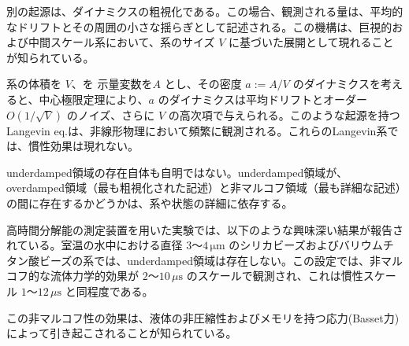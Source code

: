 \documentclass[a4paper,11pt]{jsarticle}
\numberwithin{equation}{section}
\begin{document}
別の起源は、ダイナミクスの粗視化である。この場合、観測される量は、平均的なドリフトとその周囲の小さな揺らぎとして記述される。この機構は、巨視的および中間スケール系において、系のサイズ $V$ に基づいた展開として現れることが知られている。

系の体積を $V$、を 示量変数を$A$ とし、その密度 $a := A/V$ のダイナミクスを考えると、中心極限定理により、$a$ のダイナミクスは平均ドリフトとオーダー $O(1/\sqrt{V})$ のノイズ、さらに $V$ の高次項で与えられる。このような起源を持つLangevin eq.は、非線形物理において頻繁に観測される。これらのLangevin系では、慣性効果は現れない。

underdamped領域の存在自体も自明ではない。underdamped領域が、overdamped領域（最も粗視化された記述）と非マルコフ領域（最も詳細な記述）の間に存在するかどうかは、系や状態の詳細に依存する。

高時間分解能の測定装置を用いた実験では、以下のような興味深い結果が報告されている。室温の水中における直径 $3$〜$4\,\mathrm{\mu m}$ のシリカビーズおよびバリウムチタン酸ビーズの系では、underdamped領域は存在しない。この設定では、非マルコフ的な流体力学的効果が $2$〜$10\,\mu\mathrm{s}$ のスケールで観測され、これは慣性スケール $1$〜$12\,\mu\mathrm{s}$ と同程度である。

この非マルコフ性の効果は、液体の非圧縮性およびメモリを持つ応力(Basset力)によって引き起こされることが知られている。
\end{document}
